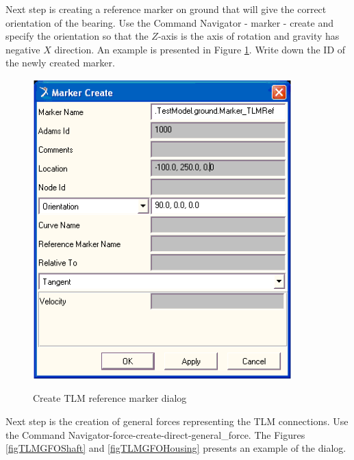 Next step is creating a reference marker on ground that will give the correct orientation of the bearing.
Use the Command Navigator - marker - create and specify the orientation so that the $Z$-axis is the axis of rotation and gravity has negative $X$ direction.
An example is presented in Figure \ref{figTLMRefMarker}.
Write down the ID of the newly created marker.

\begin{figure}[h]
\begin{center}
   {\includegraphics[width=10cm]{figs/TLMRefMarker.png}}
\end{center}
\caption{Create TLM reference marker dialog \label{figTLMRefMarker}}
\end{figure}
Next step is the creation of general forces representing the TLM connections. 
Use the Command Navigator-force-create-direct-general\_force. 
The Figures \ref{figTLMGFOShaft} and \ref{figTLMGFOHousing} presents an example of the dialog.

